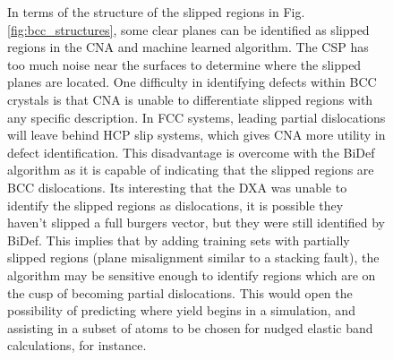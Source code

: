 \documentclass[12pt]{iopart}
\begin{document}
\begin{figure}[htbp]
In terms of the structure of the slipped regions in Fig. \ref{fig:bcc_structures}, some clear planes can be identified as slipped regions in the CNA and machine learned algorithm. The CSP has too much noise near the surfaces to determine where the slipped planes are located. One difficulty in identifying defects within BCC crystals is that CNA is unable to differentiate slipped regions with any specific description. In FCC systems, leading partial dislocations will leave behind HCP slip systems, which gives CNA more utility in defect identification. This disadvantage is overcome with the BiDef algorithm as it is capable of indicating that the slipped regions are BCC dislocations. Its interesting that the DXA was unable to identify the slipped regions as dislocations, it is possible they haven't slipped a full burgers vector, but they were still identified by BiDef. This implies that by adding training sets with partially slipped regions (plane misalignment similar to a stacking fault), the algorithm may be sensitive enough to identify regions which are on the cusp of becoming partial dislocations. This would open the possibility of predicting where yield begins in a simulation, and assisting in a subset of atoms to be chosen for nudged elastic band calculations\cite{Henkelman2000}, for instance.


\end{figure}
\end{document}
